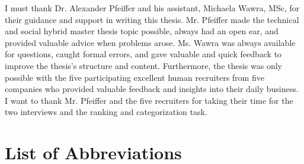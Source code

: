\documentclass[draft,final]{thesisclass} %
\begin{document}
\frontmatter %

\addstatementpage
{}
\setcounter{page}{3}



\begin{acknowledgements}
I must thank Dr. Alexander Pfeiffer and his assistant, Michaela Wawra, MSc, for their guidance and support in writing this thesis.
Mr. Pfeiffer made the technical and social hybrid master thesis topic possible, always had an open ear, and provided valuable advice when problems arose.
Ms. Wawra was always available for questions, caught formal errors, and gave valuable and quick feedback to improve the thesis's structure and content.
Furthermore, the thesis was only possible with the five participating excellent human recruiters from five companies who provided valuable feedback and insights into their daily business. I want to thank Mr. Pfeiffer and the five recruiters for taking their time for the two interviews and the ranking and categorization task.
\end{acknowledgements}

\listoffigures %
\cleardoublepage

\listoftables %
\cleardoublepage

\chapter{List of Abbreviations}
\begin{acronym}
\end{acronym}
\cleardoublepage
\end{document}
